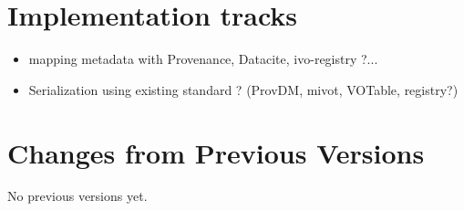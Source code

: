 \documentclass[11pt,a4paper]{ivoa}
\begin{document}
\section{Implementation tracks}

\begin{itemize}
\item mapping metadata with Provenance, Datacite, ivo-registry ?...
\item Serialization using existing standard ? (ProvDM, mivot, VOTable, registry?)
\end{itemize}

\appendix
\section{Changes from Previous Versions}

No previous versions yet.  






\end{document}
